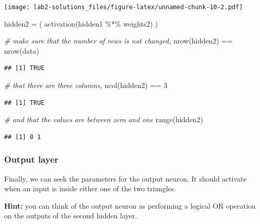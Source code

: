 \documentclass[
]{article}
\newenvironment{Shaded}{\begin{snugshade}}{\end{snugshade}}
\newcommand{\CommentTok}[1]{\textcolor[rgb]{0.56,0.35,0.01}{\textit{#1}}}
\newcommand{\DecValTok}[1]{\textcolor[rgb]{0.00,0.00,0.81}{#1}}
\newcommand{\FunctionTok}[1]{\textcolor[rgb]{0.00,0.00,0.00}{#1}}
\newcommand{\NormalTok}[1]{#1}
\newcommand{\OtherTok}[1]{\textcolor[rgb]{0.56,0.35,0.01}{#1}}
\newcommand{\SpecialCharTok}[1]{\textcolor[rgb]{0.00,0.00,0.00}{#1}}
\begin{document}
\texttt{[image: lab2-solutions\_files/figure-latex/unnamed-chunk-10-2.pdf]}

\begin{Shaded}
\begin{Highlighting}[]
\NormalTok{hidden2 }\OtherTok{=}\NormalTok{ (}
  \FunctionTok{activation}\NormalTok{(hidden1 }\SpecialCharTok{\%*\%}\NormalTok{ weights2)}
\NormalTok{)}

\CommentTok{\# make sure that the number of rows is not changed,}
\FunctionTok{nrow}\NormalTok{(hidden2) }\SpecialCharTok{==} \FunctionTok{nrow}\NormalTok{(data)}
\end{Highlighting}
\end{Shaded}

\begin{verbatim}
## [1] TRUE
\end{verbatim}

\begin{Shaded}
\begin{Highlighting}[]
\CommentTok{\# that there are three columns,}
\FunctionTok{ncol}\NormalTok{(hidden2) }\SpecialCharTok{==} \DecValTok{3}
\end{Highlighting}
\end{Shaded}

\begin{verbatim}
## [1] TRUE
\end{verbatim}

\begin{Shaded}
\begin{Highlighting}[]
\CommentTok{\# and that the values are between zero and one}
\FunctionTok{range}\NormalTok{(hidden2)}
\end{Highlighting}
\end{Shaded}

\begin{verbatim}
## [1] 0 1
\end{verbatim}

\hypertarget{output-layer}{%
\subsubsection{Output layer}\label{output-layer}}

Finally, we can seek the parameters for the output neuron. It should
activate when an input is inside either one of the two triangles.

\textbf{Hint:} you can think of the output neuron as performing a
logical OR operation on the outputs of the second hidden layer.
\end{document}
